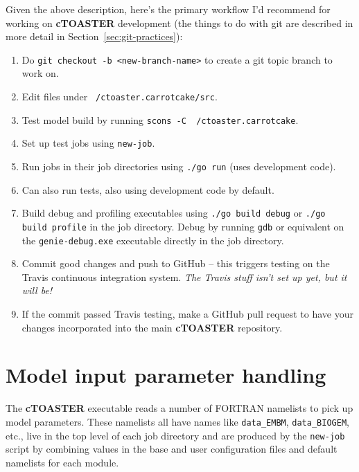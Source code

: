 \documentclass[a4paper,10pt,article]{memoir}
\begin{document}
Given the above description, here's the primary workflow I'd recommend
for working on \textbf{cTOASTER} development (the things to do with git are
described in more detail in Section~\ref{sec:git-practices}):
\begin{enumerate}
  \item{Do \texttt{git checkout -b <new-branch-name>} to create a git
    topic branch to work on.}
  \item{Edit files under \texttt{~/ctoaster.carrotcake/src}.}
  \item{Test model build by running \texttt{scons -C ~/ctoaster.carrotcake}.}
  \item{Set up test jobs using \texttt{new-job}.}
  \item{Run jobs in their job directories using \texttt{./go run}
    (uses development code).}
  \item{Can also run tests, also using development code by default.}
  \item{Build debug and profiling executables using \texttt{./go build
      debug} or \texttt{./go build profile} in the job directory.
    Debug by running \texttt{gdb} or equivalent on the
    \texttt{genie-debug.exe} executable directly in the job
    directory.}
  \item{Commit good changes and push to GitHub -- this triggers
    testing on the Travis continuous integration system.  \emph{The
      Travis stuff isn't set up yet, but it will be!}}
  \item{If the commit passed Travis testing, make a GitHub pull
    request to have your changes incorporated into the main \textbf{cTOASTER}
    repository.}
\end{enumerate}

\newpage

\section{Model input parameter handling}

The \textbf{cTOASTER} executable reads a number of FORTRAN namelists to pick up
model parameters.  These namelists all have names like
\texttt{data\_EMBM}, \texttt{data\_BIOGEM}, etc., live in the top
level of each job directory and are produced by the \texttt{new-job}
script by combining values in the base and user configuration files
and default namelists for each module.
\end{document}
